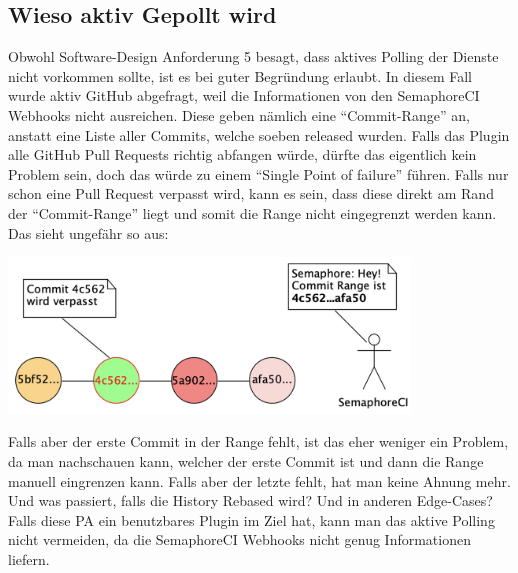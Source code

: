 \subsection{Wieso aktiv Gepollt wird}
\label{sec:why_active_polling}
Obwohl Software-Design Anforderung 5 besagt, dass aktives Polling der Dienste nicht vorkommen sollte, ist
es bei guter Begründung erlaubt. In diesem Fall wurde aktiv GitHub abgefragt, weil die Informationen von
den SemaphoreCI Webhooks nicht ausreichen. Diese geben nämlich eine \enquote{Commit-Range} an, anstatt
eine Liste aller Commits, welche soeben released wurden. \newline
Falls das Plugin alle GitHub Pull Requests richtig abfangen würde, dürfte das eigentlich kein Problem sein,
doch das würde zu einem \enquote{Single Point of failure} führen. Falls nur schon eine Pull Request verpasst
wird, kann es sein, dass diese direkt am Rand der \enquote{Commit-Range} liegt und somit die Range nicht
eingegrenzt werden kann. Das sieht ungefähr so aus:
\begin{center}
  \includegraphics[width=0.8\textwidth]{images/misc/missed_commit_range.png}
  \label{fig:commit_range}
\end{center}
Falls aber der erste Commit in der Range fehlt, ist das eher weniger ein Problem, da man nachschauen
kann, welcher der erste Commit ist und dann die Range manuell eingrenzen kann. \newline
Falls aber der letzte fehlt, hat man keine Ahnung mehr. Und was passiert, falls die History Rebased wird?
Und in anderen Edge-Cases? Falls diese PA ein benutzbares Plugin im Ziel hat, kann man das aktive Polling
nicht vermeiden, da die SemaphoreCI Webhooks nicht genug Informationen liefern.
